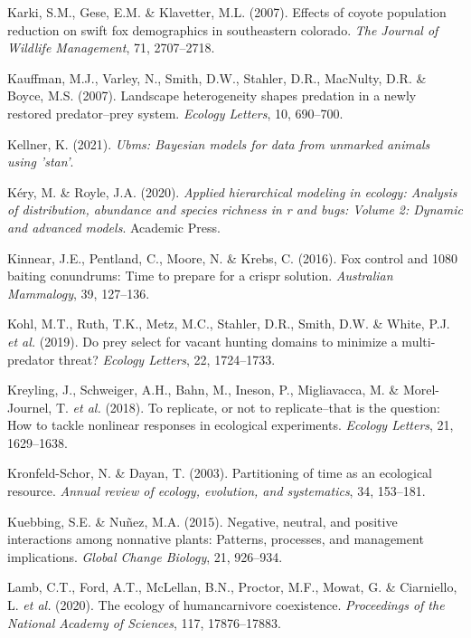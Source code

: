 \documentclass[11pt,a4paper,titlepage,twoside,openright]{style/unimelbthesis}
\begin{document}
\begin{mainmatter}
\leavevmode\hypertarget{ref-karki2007effects}{}%
Karki, S.M., Gese, E.M. \& Klavetter, M.L. (2007). Effects of coyote population reduction on swift fox demographics in southeastern colorado. \emph{The Journal of Wildlife Management}, 71, 2707--2718.

\leavevmode\hypertarget{ref-kauffman2007landscape}{}%
Kauffman, M.J., Varley, N., Smith, D.W., Stahler, D.R., MacNulty, D.R. \& Boyce, M.S. (2007). Landscape heterogeneity shapes predation in a newly restored predator--prey system. \emph{Ecology Letters}, 10, 690--700.

\leavevmode\hypertarget{ref-ubms}{}%
Kellner, K. (2021). \emph{Ubms: Bayesian models for data from unmarked animals using 'stan'}.

\leavevmode\hypertarget{ref-kery2020applied}{}%
Kéry, M. \& Royle, J.A. (2020). \emph{Applied hierarchical modeling in ecology: Analysis of distribution, abundance and species richness in r and bugs: Volume 2: Dynamic and advanced models}. Academic Press.

\leavevmode\hypertarget{ref-kinnear2016fox}{}%
Kinnear, J.E., Pentland, C., Moore, N. \& Krebs, C. (2016). Fox control and 1080 baiting conundrums: Time to prepare for a crispr solution. \emph{Australian Mammalogy}, 39, 127--136.

\leavevmode\hypertarget{ref-kohl2019prey}{}%
Kohl, M.T., Ruth, T.K., Metz, M.C., Stahler, D.R., Smith, D.W. \& White, P.J. \emph{et al.} (2019). Do prey select for vacant hunting domains to minimize a multi-predator threat? \emph{Ecology Letters}, 22, 1724--1733.

\leavevmode\hypertarget{ref-kreyling2018replicate}{}%
Kreyling, J., Schweiger, A.H., Bahn, M., Ineson, P., Migliavacca, M. \& Morel-Journel, T. \emph{et al.} (2018). To replicate, or not to replicate--that is the question: How to tackle nonlinear responses in ecological experiments. \emph{Ecology Letters}, 21, 1629--1638.

\leavevmode\hypertarget{ref-kronfeld2003partitioning}{}%
Kronfeld-Schor, N. \& Dayan, T. (2003). Partitioning of time as an ecological resource. \emph{Annual review of ecology, evolution, and systematics}, 34, 153--181.

\leavevmode\hypertarget{ref-kuebbing2015negative}{}%
Kuebbing, S.E. \& Nuñez, M.A. (2015). Negative, neutral, and positive interactions among nonnative plants: Patterns, processes, and management implications. \emph{Global Change Biology}, 21, 926--934.

\leavevmode\hypertarget{ref-lamb2020ecology}{}%
Lamb, C.T., Ford, A.T., McLellan, B.N., Proctor, M.F., Mowat, G. \& Ciarniello, L. \emph{et al.} (2020). The ecology of humancarnivore coexistence. \emph{Proceedings of the National Academy of Sciences}, 117, 17876--17883.


\end{mainmatter}
\end{document}
